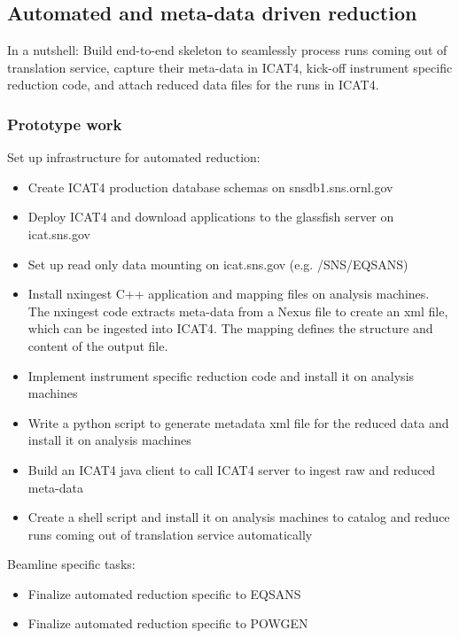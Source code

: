 \subsection{Automated and meta-data driven reduction}
\label{subsec:Automated}

In a nutshell: Build end-to-end skeleton to seamlessly process runs coming out of translation service, capture their meta-data in ICAT4, kick-off instrument specific reduction code, and attach reduced data files for the runs in ICAT4.

\subsubsection{Prototype work}
Set up infrastructure for automated reduction:
\begin{itemize}
\item Create ICAT4 production database schemas on snsdb1.sns.ornl.gov
\item Deploy ICAT4 and download applications to the glassfish server on icat.sns.gov
\item Set up read only data mounting on icat.sns.gov (e.g. /SNS/EQSANS) 
\item Install nxingest C++ application and mapping files on analysis machines. The nxingest code extracts meta-data from a Nexus file to create an xml file, which can be ingested into ICAT4. The mapping defines the structure and content of the output file.
\item Implement instrument specific reduction code and install it on analysis machines
\item Write a python script to generate metadata xml file for the reduced data and install it on analysis machines
\item Build an ICAT4 java client to call ICAT4 server to ingest raw and reduced meta-data
\item Create a shell script and install it on analysis machines to catalog and reduce runs coming out of translation service automatically
\end{itemize}
Beamline specific tasks:
\begin{itemize}
\item Finalize automated reduction specific to EQSANS
\item Finalize automated reduction specific to POWGEN
\end{itemize}

